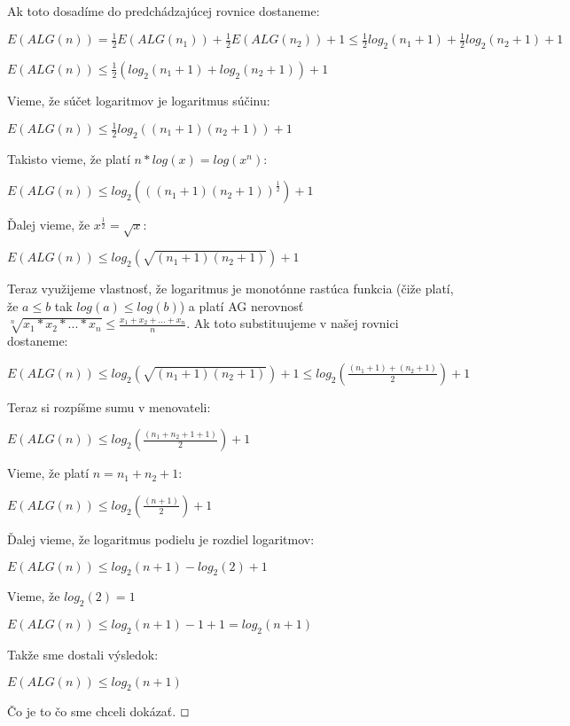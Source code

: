 \documentclass[a4paper]{article}
\begin{document}
Ak toto dosadíme do predchádzajúcej rovnice dostaneme:

$E(ALG(n)) = \frac{1}{2}E(ALG(n_1)) + \frac{1}{2}E(ALG(n_2)) + 1 \leq \frac{1}{2}log_2(n_1+1) + \frac{1}{2}log_2(n_2+1) + 1$

$E(ALG(n)) \leq \frac{1}{2}(log_2(n_1+1) + log_2(n_2+1)) + 1$

Vieme, že súčet logaritmov je logaritmus súčinu:

$E(ALG(n)) \leq \frac{1}{2}log_2((n_1+1)(n_2+1)) + 1$

Takisto vieme, že platí $n*log(x)=log(x^n)$:

$E(ALG(n)) \leq log_2(((n_1+1)(n_2+1))^{\frac{1}{2}}) + 1$

Ďalej vieme, že $x^{\frac{1}{2}} = \sqrt{x}$:

$E(ALG(n)) \leq log_2(\sqrt{(n_1+1)(n_2+1)}) + 1$

Teraz využijeme vlastnosť, že logaritmus je monotónne rastúca funkcia (čiže platí, že $a\leq b$ tak $log(a) \leq log(b)$) a platí AG nerovnosť $\sqrt[n]{x_1*x_2*...*x_n} \leq \frac{x_1+x_2+...+x_n}{n}$. Ak toto substituujeme v našej rovnici dostaneme:

$E(ALG(n)) \leq log_2(\sqrt{(n_1+1)(n_2+1)}) + 1 \leq log_2(\frac{(n_1+1)+(n_2+1)}{2}) + 1$ 

Teraz si rozpíšme sumu v menovateli:

$E(ALG(n)) \leq log_2(\frac{(n_1+n_2+1+1)}{2}) + 1$ 

Vieme, že platí $n=n_1+n_2+1$:

$E(ALG(n)) \leq log_2(\frac{(n+1)}{2}) + 1$ 

Ďalej vieme, že logaritmus podielu je rozdiel logaritmov:

$E(ALG(n)) \leq log_2(n+1) - log_2(2) + 1$ 

Vieme, že $log_2(2) = 1$

$E(ALG(n)) \leq log_2(n+1) - 1 + 1 = log_2(n+1)$ 

Takže sme dostali výsledok:

$E(ALG(n)) \leq  log_2(n+1)$ 

Čo je to čo sme chceli dokázať. $\oblong$
\end{document}
